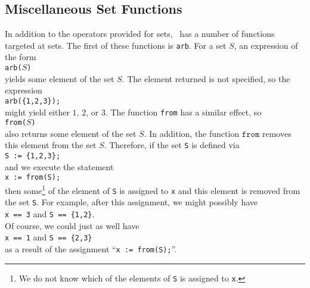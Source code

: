 \subsection{Miscellaneous Set Functions}
In addition to the operators provided for sets, \setlx\ has a number of functions targeted at sets.
The first of these functions is \texttt{arb}.  For a set $S$,  an expression of the form
\\[0.2cm]
\hspace*{1.3cm}
\texttt{arb($S$)}
\\[0.2cm]
yields some element of the set $S$.  The element returned is not specified, so the expression
\\[0.2cm]
\hspace*{1.3cm}
\texttt{arb(\{1,2,3\});}
\\[0.2cm]
might yield either $1$, $2$, or $3$.  The function \texttt{from} has a similar effect, so
\\[0.2cm]
\hspace*{1.3cm}
\texttt{from($S$)}
\\[0.2cm]
also returns some element of the set $S$.  In addition, the function $\mathtt{from}$ removes this element from
the set $S$.  Therefore, if the set \texttt{S} is defined via
\\[0.2cm]
\hspace*{1.3cm}
\texttt{S := \{1,2,3\};}
\\[0.2cm]
and we execute the statement 
\\[0.2cm]
\hspace*{1.3cm}
\texttt{x := from(S);}
\\[0.2cm]
then some\footnote{We do not know which of the elements of \texttt{S} is assigned to \texttt{x}.} of the
element of \texttt{S} is assigned to \texttt{x} and this element is removed from  
the set \texttt{S}.  For example, after this assignment, we might possibly have
\\[0.2cm]
\hspace*{1.3cm}
\texttt{x == 3} \quad and \quad \texttt{S == \{1,2\}}.
\\[0.2cm]
Of course, we could just as well have
\\[0.2cm]
\hspace*{1.3cm}
\texttt{x == 1} \quad and \quad \texttt{S == \{2,3\}}
\\[0.2cm]
as a result of the assignment ``\texttt{x := from(S);}''.

